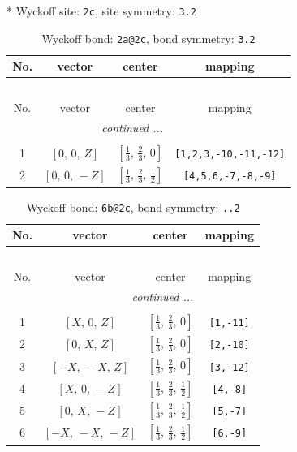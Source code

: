 \documentclass[fleqn,8pt]{jsarticle}
\begin{document}
* Wyckoff site: {\tt 2c}, site symmetry: {\tt 3.2}
\renewcommand{\arraystretch}{1.2}
\begin{longtable}{cccc}
\caption{Wyckoff bond: {\tt 2a@2c}, bond symmetry: {\tt 3.2}}
 \\
 \hline \hline
No. & vector & center & mapping \\ \hline \endfirsthead

\multicolumn{3}{l}{\tablename\ \thetable{}} \\
 \hline \hline
No. & vector & center & mapping \\ \hline \endhead

 \hline \hline
\multicolumn{3}{r}{\footnotesize\it continued ...} \\ \endfoot

 \hline \hline
\multicolumn{3}{r}{} \\ \endlastfoot

1 & $\left[ 0,\, 0,\, Z \right]$ & $\left[ \frac{1}{3},\, \frac{2}{3},\, 0 \right]$ & {\tt [1,2,3,-10,-11,-12]} \\ \hline
2 & $\left[ 0,\, 0,\, - Z \right]$ & $\left[ \frac{1}{3},\, \frac{2}{3},\, \frac{1}{2} \right]$ & {\tt [4,5,6,-7,-8,-9]} \\
\end{longtable}
\renewcommand{\arraystretch}{1.2}
\begin{longtable}{cccc}
\caption{Wyckoff bond: {\tt 6b@2c}, bond symmetry: {\tt ..2}}
 \\
 \hline \hline
No. & vector & center & mapping \\ \hline \endfirsthead

\multicolumn{3}{l}{\tablename\ \thetable{}} \\
 \hline \hline
No. & vector & center & mapping \\ \hline \endhead

 \hline \hline
\multicolumn{3}{r}{\footnotesize\it continued ...} \\ \endfoot

 \hline \hline
\multicolumn{3}{r}{} \\ \endlastfoot

1 & $\left[ X,\, 0,\, Z \right]$ & $\left[ \frac{1}{3},\, \frac{2}{3},\, 0 \right]$ & {\tt [1,-11]} \\ \hline
2 & $\left[ 0,\, X,\, Z \right]$ & $\left[ \frac{1}{3},\, \frac{2}{3},\, 0 \right]$ & {\tt [2,-10]} \\ \hline
3 & $\left[ - X,\, - X,\, Z \right]$ & $\left[ \frac{1}{3},\, \frac{2}{3},\, 0 \right]$ & {\tt [3,-12]} \\ \hline
4 & $\left[ X,\, 0,\, - Z \right]$ & $\left[ \frac{1}{3},\, \frac{2}{3},\, \frac{1}{2} \right]$ & {\tt [4,-8]} \\ \hline
5 & $\left[ 0,\, X,\, - Z \right]$ & $\left[ \frac{1}{3},\, \frac{2}{3},\, \frac{1}{2} \right]$ & {\tt [5,-7]} \\ \hline
6 & $\left[ - X,\, - X,\, - Z \right]$ & $\left[ \frac{1}{3},\, \frac{2}{3},\, \frac{1}{2} \right]$ & {\tt [6,-9]} \\
\end{longtable}
\end{document}
